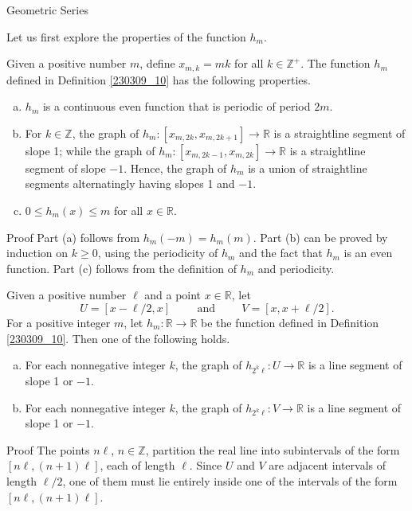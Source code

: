 \begin{example}[label=230305_16]{Geometric Series}
\begin{example}[label=230304_9]{}
\begin{example}{}
\begin{example}{}
 Let us first explore the properties of the function $h_m$.
\begin{lemma}[label=230309_9]{}
Given  a positive number $m$, define $x_{m,k}=mk$ for all $k\in\mathbb{Z}^+$. The function $h_m$ defined in Definition \ref{230309_10} has the following properties.
\begin{enumerate}[(a)]
\item $h_m$  is a continuous even function that is periodic of period $2m$.
\item For $k\in \mathbb{Z}$,  the graph of $h_m:[x_{m,2k}, x_{m, 2k+1}]\to\mathbb{R}$ is a straightline segment of slope 1; while the graph of $h_m:[x_{m,2k-1}, x_{m, 2k}]\to\mathbb{R}$ is a straightline segment of slope $-1$. Hence, the graph  of $h_m$ is a union of straightline segments alternatingly having slopes 1 and $-1$.
\item $0\leq h_m(x)\leq m$ for all $x\in\mathbb{R}$.
\end{enumerate}
\end{lemma}
\begin{myproof}
{Proof}
Part (a) follows from $h_m(-m)=h_m(m)$. Part (b) can be proved by  induction on $k\geq 0$, using the periodicity of $h_m$ and the fact that $h_m$ is an even function.  Part (c) follows from the definition of $h_m$ and periodicity.
\end{myproof}

\begin{lemma}[label=230309_13]{}
Given  a positive number $\ell$ and a point  $x\in \mathbb{R}$, let \[U=[x-\ell /2, x]\hspace{1cm} \text{and} \hspace{1cm} V=[x,x+\ell/2].\] For a positive integer $m$, let $h_m:\mathbb{R}\to\mathbb{R}$ be the function defined in Definition \ref{230309_10}. Then  one of the following holds.
 
\begin{enumerate}[(a)]
\item For each nonnegative integer $k$, the graph of $h_{2^k\ell}:U\to\mathbb{R}$ is a line segment of slope 1 or $-1$.

\item  For each nonnegative integer $k$, the graph of $h_{2^k\ell}:V\to\mathbb{R}$ is a line segment of slope 1 or $-1$.

\end{enumerate}
\end{lemma}
\begin{myproof}{Proof} 
The points $n\ell$, $n\in\mathbb{Z}$, partition the real line into subintervals of the form $[n\ell, (n+1)\ell]$, each of length $\ell$. Since $U$ and $V$ are adjacent intervals of length $\ell/2$, one of them must lie entirely inside one of the intervals of the form $[n\ell, (n+1)\ell]$.
 




\end{myproof}
\end{example}
\end{example}
\end{example}
\end{example}
